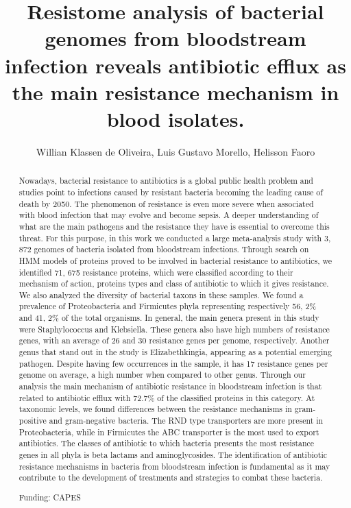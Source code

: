 \documentclass[twoside]{article}
\title{\vspace{-15mm}\fontsize{24pt}{10pt}\selectfont\textbf{ Resistome analysis of bacterial genomes from bloodstream infection reveals antibiotic efflux as the main resistance mechanism in blood isolates. }} %
\author{ Willian Klassen de Oliveira, Luis Gustavo Morello, Helisson Faoro }
\affil{ Instituto Carlos Chagas - FIOCRUZ PR }
\date{}
\begin{document}
  
  
  \maketitle %
  
  
  \thispagestyle{fancy} %
  
  
  \begin{abstract}
  Nowadays,  bacterial resistance to antibiotics is a global public health problem and studies point to infections caused by resistant bacteria becoming the leading cause of death by 2050. The phenomenon of resistance is even more severe when associated with blood infection that may evolve and become sepsis. A deeper understanding of what are the main pathogens and the resistance they have is essential to overcome this threat. For this purpose,  in this work we conducted a large meta-analysis study with 3, 872 genomes of bacteria isolated from bloodstream infections. Through search on HMM models of proteins proved to be involved in bacterial resistance to antibiotics,  we identified 71, 675 resistance proteins,  which were classified according to their mechanism of action,  proteins types and class of antibiotic to which it gives resistance. We also analyzed the diversity of bacterial taxons in these samples. We found a prevalence of Proteobacteria and Firmicutes phyla representing respectively 56, 2\% and 41, 2\% of the total organisms. In general,  the main genera present in this study were Staphylococcus and Klebsiella. These genera also have high numbers of resistance genes,  with an average of 26 and 30 resistance genes per genome,  respectively. Another genus that stand out in the study is Elizabethkingia,  appearing as a potential emerging pathogen. Despite having few occurrences in the sample,  it has 17 resistance genes per genome on average,  a high number when compared to other genus. Through our analysis the main mechanism of antibiotic resistance in bloodstream infection is that related to antibiotic efflux with 72.7\% of the classified proteins in this category. At taxonomic levels,  we found differences between the resistance mechanisms in gram-positive and gram-negative bacteria. The RND type transporters are more present in Proteobacteria,  while in Firmicutes the ABC transporter is the most used to export antibiotics. The classes of antibiotic to which bacteria presents the most resistance genes in all phyla is beta lactams and aminoglycosides. The identification of antibiotic resistance mechanisms in bacteria from bloodstream infection is fundamental as it may contribute to the development of treatments and strategies to combat these bacteria.
  
  Funding: CAPES \\ 
  \end{abstract}
  
\end{document}

